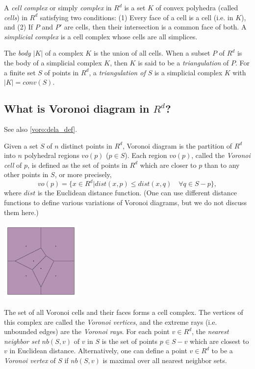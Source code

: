 \documentclass[a4paper,12pt]{article}
\begin{document}
A {\em cell complex\/} or simply {\em complex} in 
$R^d$ is a set $K$ of convex polyhedra (called 
{\em cells\/}) in $R^d$ satisfying two conditions: 
(1) Every face of a cell is a cell (i.e. in $K$), and (2) If $P$ and $P'$ are
cells, then their intersection is a common face of both.  
A {\em simplicial complex\/} is a cell complex whose cells are all 
simplices.

The {\em body\/} $|K|$ of a complex $K$ is the union of all cells.
When a subset $P$ of $R^d$ is the body of a simplicial complex $K$,
then $K$ is said to be a {\em triangulation\/} of $P$.
For a finite set $S$ of points in $R^d$, a {\em triangulation of $S$}
is a simplicial complex $K$ with $|K|=conv(S)$.

\subsection{What is Voronoi diagram in $R^d$?} \label{voro:def}

See also \ref{voro:dela_def}.

Given a set $S$ of $n$ distinct points in $R^d$,
Voronoi diagram is the partition of $R^d$ into $n$ polyhedral regions 
$vo(p)$ ($p \in S$).  Each region $vo(p)$,
called the {\em Voronoi cell\/} of $p$,
is defined as the set of points in $R^d$ which are
closer to $p$ than to any other points in $S$, or more precisely,
\[
vo(p) = \{ x \in R^d | dist(x, p) \leq dist(x, q) \quad \forall q\in S - p \},
\]
where $dist$ is the Euclidean distance function.  (One can
use different distance functions to define various
variations of Voronoi diagrams, but we do not
discuss them here.)

\bigskip
\begin{center}
\includegraphics[height=40mm]{vtest_fig_vo}
\end{center}

The set of all Voronoi cells and their faces forms a cell complex.
The vertices of this complex are called the {\em Voronoi vertices\/},
and the extreme rays (i.e. unbounded edges) are  the {\em Voronoi rays\/}.
For each point $v\in R^d$,  the {\em nearest neighbor set\/} 
$nb(S, v)$ of $v$ in $S$ is the set of points $p \in S-v$ which
are closest to $v$ in Euclidean distance.
Alternatively, one can define a point $v \in R^d$ 
to be a {\em Voronoi vertex\/} of $S$ if $nb(S, v)$
is maximal over all nearest neighbor sets.
\end{document}
